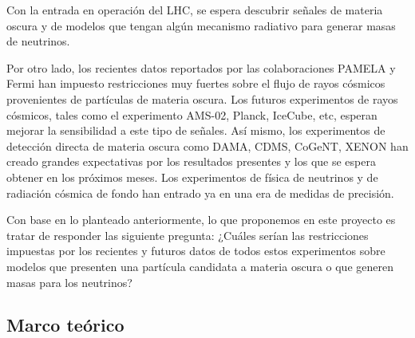 \begin{ideas}
  
Con la entrada en operación del LHC, se espera descubrir señales de materia oscura y de modelos que tengan algún mecanismo radiativo para generar masas de neutrinos.

Por otro lado, los recientes datos reportados por las colaboraciones PAMELA y Fermi han impuesto restricciones muy fuertes sobre el flujo de rayos cósmicos provenientes de partículas de materia oscura. Los futuros experimentos de rayos cósmicos, tales como el experimento AMS-02, Planck, IceCube, etc, esperan mejorar la sensibilidad a este tipo de señales. Así mismo, los experimentos de detección directa de materia oscura como DAMA, CDMS, CoGeNT, XENON han creado grandes expectativas por los resultados presentes y los que se espera obtener en los próximos meses. Los experimentos de física de neutrinos y de radiación cósmica de fondo han entrado ya en una era de medidas de precisión.

Con base en lo planteado anteriormente, lo que proponemos en este proyecto es tratar de responder las siguiente pregunta: ¿Cuáles serían las restricciones impuestas por los recientes y futuros datos de todos estos experimentos sobre  modelos que presenten una partícula candidata a materia oscura o que generen masas para los neutrinos?


\subsection{Marco teórico}
\end{ideas}

